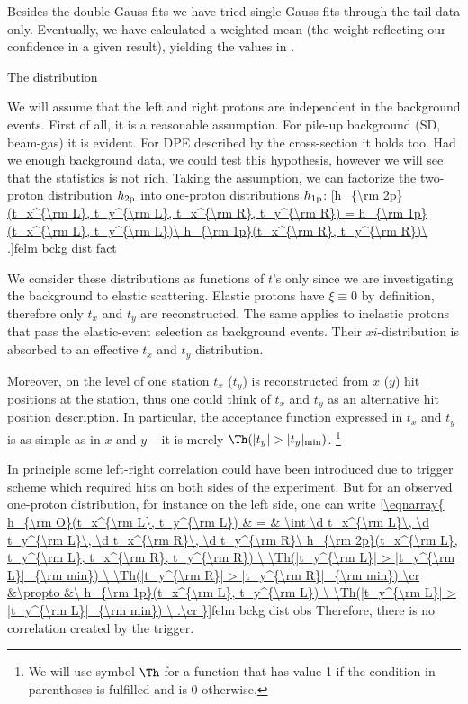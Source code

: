 Besides the double-Gauss fits we have tried single-Gauss fits through the tail data only. Eventually, we have calculated a weighted mean (the weight reflecting our confidence in a given result), yielding the values in .


\caption{The distribution}

We will assume that the left and right protons are independent in the background events. First of all, it is a reasonable assumption. For pile-up background (SD, beam-gas) it is evident. For DPE described by the cross-section  it holds too. Had we enough background data, we could test this hypothesis, however we will see that the statistics is not rich. Taking the assumption, we can factorize the two-proton distribution $h_{\rm 2p}$ into one-proton distributions $h_{\rm 1p}$:
\eqref{h_{\rm 2p}(t_x^{\rm L}, t_y^{\rm L}, t_x^{\rm R}, t_y^{\rm R}) = h_{\rm 1p}(t_x^{\rm L}, t_y^{\rm L})\ h_{\rm 1p}(t_x^{\rm R}, t_y^{\rm R})\ .}{felm bckg dist fact}

We consider these distributions as functions of $t$'s only since we are investigating the background to elastic scattering. Elastic protons have $\xi\equiv 0$ by definition, therefore only $t_x$ and $t_y$ are reconstructed. The same applies to inelastic protons that pass the elastic-event selection as background events. Their $xi$-distribution is absorbed to an effective $t_x$ and $t_y$ distribution.

Moreover, on the level of one station $t_x$ ($t_y$) is reconstructed from $x$ ($y$) hit positions at the station, thus one could think of $t_x$ and $t_y$ as an alternative hit position description. In particular, the acceptance function expressed in $t_x$ and $t_y$ is as simple as in $x$ and $y$ -- it is merely $\Th(|t_y| > |t_y|_{\rm min})$. \footnote{%
We will use symbol $\Th$ for a function that has value 1 if the condition in parentheses is fulfilled and is 0 otherwise.
}

In principle some left-right correlation could have been introduced due to trigger scheme which required hits on both sides of the experiment. But for an observed one-proton distribution, for instance on the left side, one can write
\eqref{\eqnarray{
h_{\rm O}(t_x^{\rm L}, t_y^{\rm L}) & = &
\int \d t_x^{\rm L}\, \d t_y^{\rm L}\, \d t_x^{\rm R}\, \d t_y^{\rm R}\ h_{\rm 2p}(t_x^{\rm L}, t_y^{\rm L}, t_x^{\rm R}, t_y^{\rm R})
	\ \Th(|t_y^{\rm L}| > |t_y^{\rm L}|_{\rm min})
	\ \Th(|t_y^{\rm R}| > |t_y^{\rm R}|_{\rm min})
\cr
&\propto &\ h_{\rm 1p}(t_x^{\rm L}, t_y^{\rm L})
	\ \Th(|t_y^{\rm L}| > |t_y^{\rm L}|_{\rm min})
\ .\cr
}}{felm bckg dist obs}
Therefore, there is no correlation created by the trigger.

